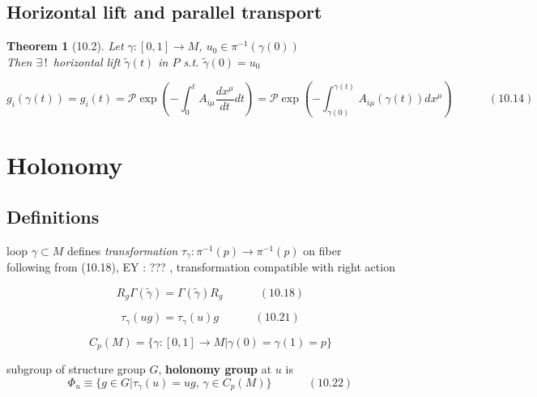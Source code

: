 \documentclass{book}
\newtheorem{theorem}{Theorem}
\begin{document}
\subsection{ Horizontal lift and parallel transport }

\begin{theorem}[10.2] Let $\gamma:[0,1] \to M$, $u_0 \in \pi^{-1}(\gamma(0))$ \\
Then $\exists \, ! \, $ horizontal lift $\widetilde{\gamma}(t)$ in $P$ s.t. $\widetilde{\gamma}{(0)} = u_0$ 
\end{theorem}



\begin{equation}
  g_i(\gamma(t)) = g_i(t) = \mathcal{P}\exp{ \left( -\int_0^t A_{i \mu} \frac{dx^{\mu} }{dt} dt \right) } = \mathcal{P}\exp{ \left( - \int_{\gamma(0)}^{\gamma(t)} A_{i\mu}(\gamma(t))dx^{\mu} \right) } \quad \quad \quad \, (10.14)
\end{equation}

\section{Holonomy}

\subsection{Definitions}

loop $\gamma \subset M$ defines \emph{transformation} $\tau_{\gamma}: \pi^{-1}(p) \to \pi^{-1}(p)$ on fiber \\
following from (10.18), EY : ??? , transformation compatible with right action

\begin{equation}
  R_g \Gamma(\widetilde{\gamma}) = \Gamma(\widetilde{\gamma})R_g \quad \quad \quad \, (10.18)
\end{equation}

\begin{equation}
  \tau_{\gamma}(ug) = \tau_{\gamma}(u)g  \quad \quad \quad \, (10.21)
\end{equation}


\[
C_p(M) = \lbrace \gamma: [0,1] \to M | \gamma(0)=  \gamma(1) = p \rbrace
\]

subgroup of structure group $G$, \textbf{holonomy group} at $u$ is 
\begin{equation}
 \Phi_u \equiv \lbrace g \in G | \tau_{\gamma}(u) = ug, \, \gamma \in C_p(M) \rbrace   \quad \quad \quad \, (10.22)
\end{equation}
\end{document}
